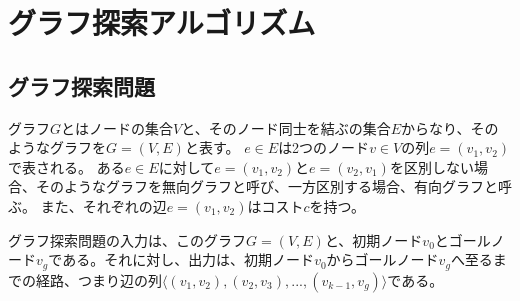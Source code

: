 \documentclass[a4paper,11pt,oneside,openany]{jsbook}
\begin{document}



\newpage
\section{グラフ探索アルゴリズム}
\subsection{グラフ探索問題}
グラフ$G$とはノードの集合$V$と、そのノード同士を結ぶの集合$E$からなり、そのようなグラフを$G=(V,E)$と表す。
$e \in E$は2つのノード$v \in V$の列$e = (v_{1}, v_{2})$で表される。
ある$e \in E$に対して$e = (v_{1}, v_{2})$と$e = (v_{2}, v_{1})$を区別しない場合、そのようなグラフを無向グラフと呼び、一方区別する場合、有向グラフと呼ぶ。
また、それぞれの辺$e = (v_{1}, v_{2})$はコスト$c$を持つ。

グラフ探索問題の入力は、このグラフ$G=(V,E)$と、初期ノード$v_0$とゴールノード$v_g$である。それに対し、出力は、初期ノード$v_0$からゴールノード$v_g$へ至るまでの経路、つまり辺の列$\langle(v_{1}, v_{2}), (v_{2}, v_{3}), ...,(v_{k-1}, v_{g}) \rangle$である。
\end{document}
